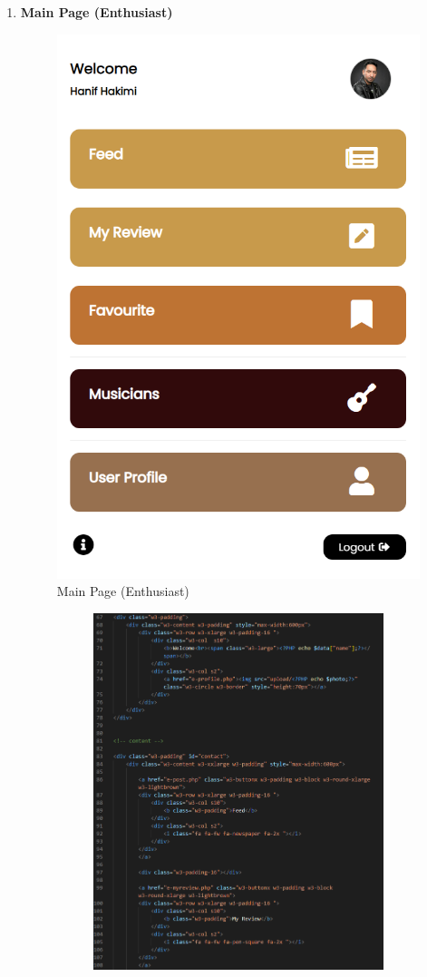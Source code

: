 \begin{enumerate}[1.]
    \item \textbf{Main Page (Enthusiast)}
    \begin{figure}[h]
        \centering
        \includegraphics[width=0.5\linewidth]{mainmatter/images/frontend/ss/Main Page (Enthusiast).png}
        \caption{Main Page (Enthusiast)}
        \label{fig:myfig62}
    \end{figure}
    \begin{figure}[h]\ContinuedFloat
        \centering
        \begin{subfigure}[b]{0.6\textwidth}
            \centering
            \includegraphics[width=\textwidth]{mainmatter/images/frontend/code/emain.png}

\end{subfigure}
\end{figure}
\end{enumerate}
